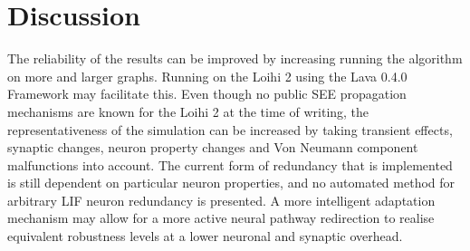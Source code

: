 \section{Discussion}\label{sec:discussion}
The reliability of the results can be improved by increasing running the algorithm on more and larger graphs. Running on the Loihi 2 using the Lava 0.4.0 Framework may facilitate this. Even though no public SEE propagation mechanisms are known for the Loihi 2 at the time of writing, the representativeness of the simulation can be increased by taking transient effects, synaptic changes, neuron property changes and Von Neumann component malfunctions into account. The current form of redundancy that is implemented is still dependent on particular neuron properties, and no automated method for arbitrary LIF neuron redundancy is presented. A more intelligent adaptation mechanism may allow for a more active neural pathway redirection to realise equivalent robustness levels at a lower neuronal and synaptic overhead. 


